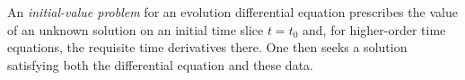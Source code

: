 
An \emph{initial-value problem} for an evolution differential equation prescribes the value of an unknown solution on an initial time slice $t=t_0$ and, for higher-order time equations, the requisite time derivatives there. One then seeks a solution satisfying both the differential equation and these data.
